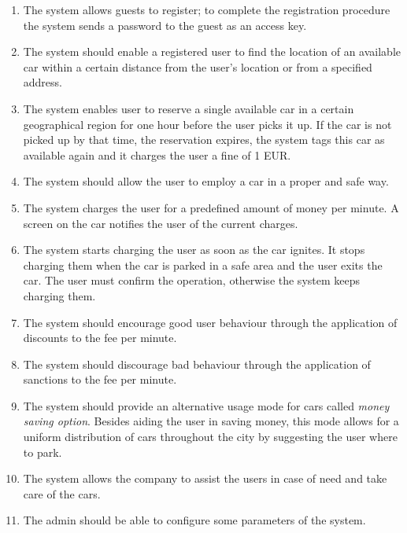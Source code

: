 
			
			\begin{enumerate}
				\item The system allows guests to register; to complete the registration procedure the system sends a password to the guest as an access key.
				\item The system should enable a registered user to find the location of an available car within a certain distance from the user's location or from a specified address.
				\item The system enables user to reserve a single available car in a certain geographical region for one hour before the user picks it up. If the car is not picked up by that time, the reservation expires, the system tags this car as available again and it charges the user a fine of 1 EUR.
				
				\item The system should allow the user to employ a car in a proper and safe way. 				
								
				\item The system charges the user for a predefined amount of money per minute. A screen on the car notifies the user of the current charges.
				\item The system starts charging the user as soon as the car ignites. It stops charging them when the car is parked in a safe area and the user exits the car. The user must confirm the operation, otherwise the system keeps charging them. 
				\item The system should encourage good user behaviour through the application of discounts to the fee per minute. 
				\item The system should discourage bad behaviour through the application of sanctions to the fee per minute. 
				\item The system should provide an alternative usage mode for cars called \textit{money saving option}. Besides aiding the user in saving money, this mode allows for a uniform distribution of cars throughout the city by suggesting the user where to park.
				\item The system allows the company to assist the users in case of need and take care of the cars.				
				\item The admin should be able to configure some parameters of the system.
			\end{enumerate}	